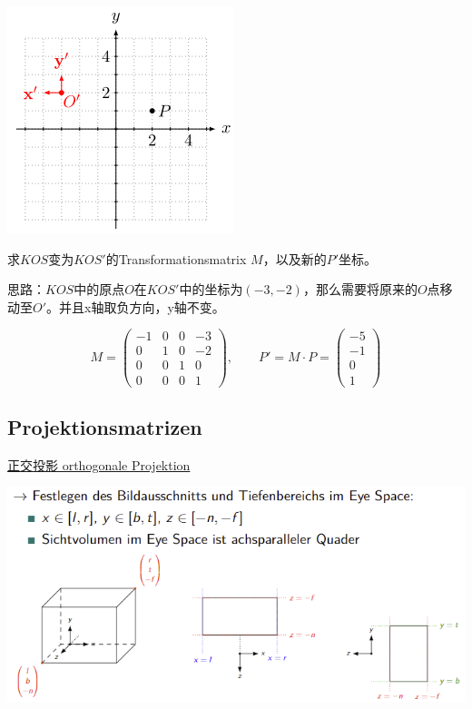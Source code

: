\documentclass[fleqn]{article}
\begin{document}
\begin{center}
    \includegraphics[scale=0.6]{8.png}
\end{center}

求$KOS$变为$KOS'$的Transformationsmatrix $M$，以及新的$P'$坐标。

思路：$KOS$中的原点$O$在$KOS'$中的坐标为$(-3,-2)$，那么需要将原来的$O$点移动至$O'$。并且x轴取负方向，y轴不变。

$$M =\begin{pmatrix} -1 & 0 & 0 & -3 \\ 0 &1&0&-2\\ 0&0&1&0 \\ 0&0&0&1 \end{pmatrix},\qquad
P' = M \cdot P = \begin{pmatrix} -5\\-1\\0\\1 \end{pmatrix}$$

\subsection{Projektionsmatrizen}

\noindent\underline{正交投影 orthogonale Projektion}

\begin{center}
    \includegraphics[scale=0.6]{10.png}
\end{center}
\end{document}
